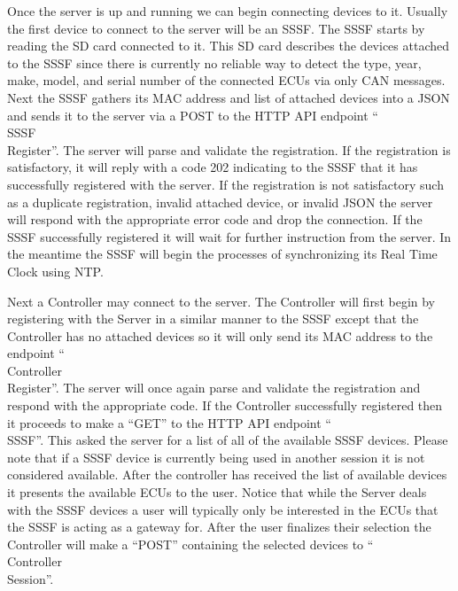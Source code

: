 \documentclass[letterpaper,twocolumn,12pt]{article}
\begin{document}
Once the server is up and running we can begin connecting devices to it. Usually the first device to connect to the server will be an SSSF. The SSSF starts by reading the SD card connected to it. This SD card describes the devices attached to the SSSF since there is currently no reliable way to detect the type, year, make, model, and serial number of the connected ECUs via only CAN messages. Next the SSSF gathers its MAC address and list of attached devices into a JSON and sends it to the server via a POST to the HTTP API endpoint “\\SSSF\\Register”. The server will parse and validate the registration. If the registration is satisfactory, it will reply with a code 202 indicating to the SSSF that it has successfully registered with the server. If the registration is not satisfactory such as a duplicate registration, invalid attached device, or invalid JSON the server will respond with the appropriate error code and drop the connection. If the SSSF successfully registered it will wait for further instruction from the server. In the meantime the SSSF will begin the processes of synchronizing its Real Time Clock using NTP.

Next a Controller may connect to the server. The Controller will first begin by registering with the Server in a similar manner to the SSSF except that the Controller has no attached devices so it will only send its MAC address to the endpoint “\\Controller\\Register”. The server will once again parse and validate the registration and respond with the appropriate code. If the Controller successfully registered then it proceeds to make a “GET” to the HTTP API endpoint “\\SSSF”. This asked the server for a list of all of the available SSSF devices. Please note that if a SSSF device is currently being used in another session it is not considered available. After the controller has received the list of available devices it presents the available ECUs to the user. Notice that while the Server deals with the SSSF devices a user will typically only be interested in the ECUs that the SSSF is acting as a gateway for. After the user finalizes their selection the Controller will make a “POST” containing the selected devices to “\\Controller\\Session”.
\end{document}
